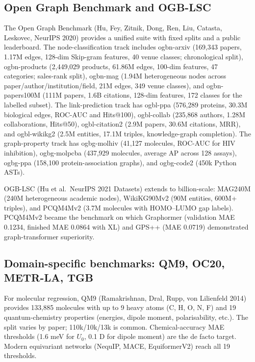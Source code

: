 \subsection{Open Graph Benchmark and OGB-LSC}\label{open-graph-benchmark-and-ogb-lsc}

The Open Graph Benchmark (Hu, Fey, Zitnik, Dong, Ren, Liu, Catasta, Leskovec, NeurIPS 2020) provides a unified suite with fixed splits and a public leaderboard. The node-classification track includes ogbn-arxiv (169,343 papers, 1.17M edges, 128-dim Skip-gram features, 40 venue classes; chronological split), ogbn-products (2,449,029 products, 61.86M edges, 100-dim features, 47 categories; sales-rank split), ogbn-mag (1.94M heterogeneous nodes across paper/author/institution/field, 21M edges, 349 venue classes), and ogbn-papers100M (111M papers, 1.6B citations, 128-dim features, 172 classes for the labelled subset). The link-prediction track has ogbl-ppa (576,289 proteins, 30.3M biological edges, ROC-AUC and Hits@100), ogbl-collab (235,868 authors, 1.28M collaborations, Hits@50), ogbl-citation2 (2.9M papers, 30.6M citations, MRR), and ogbl-wikikg2 (2.5M entities, 17.1M triples, knowledge-graph completion). The graph-property track has ogbg-molhiv (41,127 molecules, ROC-AUC for HIV inhibition), ogbg-molpcba (437,929 molecules, average AP across 128 assays), ogbg-ppa (158,100 protein-association graphs), and ogbg-code2 (450k Python ASTs).

OGB-LSC (Hu et al.~NeurIPS 2021 Datasets) extends to billion-scale: MAG240M (240M heterogeneous academic nodes), WikiKG90Mv2 (90M entities, 600M+ triples), and PCQM4Mv2 (3.7M molecules with HOMO--LUMO gap labels). PCQM4Mv2 became the benchmark on which Graphormer (validation MAE 0.1234, finished MAE 0.0864 with XL) and GPS++ (MAE 0.0719) demonstrated graph-transformer superiority.

\subsection{Domain-specific benchmarks: QM9, OC20, METR-LA, TGB}\label{domain-specific-benchmarks-qm9-oc20-metr-la-tgb}

For molecular regression, QM9 (Ramakrishnan, Dral, Rupp, von Lilienfeld 2014) provides 133,885 molecules with up to 9 heavy atoms (C, H, O, N, F) and 19 quantum-chemistry properties (energies, dipole moment, polarisability, etc.). The split varies by paper; 110k/10k/13k is common. Chemical-accuracy MAE thresholds (1.6 meV for \(U_0\), 0.1 D for dipole moment) are the de facto target. Modern equivariant networks (NequIP, MACE, EquiformerV2) reach all 19 thresholds.

